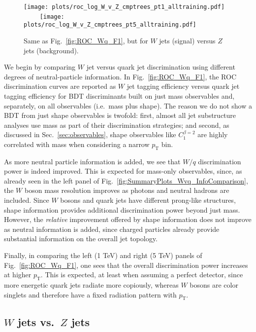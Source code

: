 \documentclass[11pt,letterpaper]{article}
\DeclareRobustCommand{\Sec}[1]{Sec.~\ref{#1}}
\DeclareRobustCommand{\Fig}[1]{Fig.~\ref{#1}}
\newcommand{\pt}{p_{\mathrm{T}}}
\begin{document}
\begin{figure}[p]
\begin{center}
\texttt{[image: plots/roc\_log\_W\_v\_Z\_cmptrees\_pt1\_alltraining.pdf]}
$\qquad$
\texttt{[image: plots/roc\_log\_W\_v\_Z\_cmptrees\_pt5\_alltraining.pdf]}
\end{center}
\caption{Same as \Fig{fig:ROC_Wq_F1}, but for $W$ jets (signal) versus $Z$ jets (background).}
\label{fig:ROC_WZ_F1}
\end{figure}


We begin by comparing $W$ jet versus quark jet discrimination using different degrees of neutral-particle information.
%
In \Fig{fig:ROC_Wq_F1}, the ROC discrimination curves are reported as $W$ jet tagging efficiency versus quark jet tagging efficiency for BDT discriminants built on just mass observables and, separately, on all observables (i.e.~mass plus shape).
%
The reason we do not show a BDT from just shape observables is twofold:  first, almost all jet substructure analyses use mass as part of their discrimination strategies; and second, as discussed in \Sec{sec:observables}, shape observables like $C_1^{\beta = 2}$ are highly correlated with mass when considering a narrow $\pt$ bin.

As more neutral particle information is added, we see that $W/q$ discrimination power is indeed improved.
%
This is expected for mass-only observables, since, as already seen in the left panel of \Fig{fig:SummaryPlots_Wvq_InfoComparison}, the $W$ boson mass resolution improves as photons and neutral hadrons are included.
%
Since $W$ bosons and quark jets have different prong-like structures, shape information provides additional discrimination power beyond just mass.
%
However, the \emph{relative} improvement offered by shape information does not improve as neutral information is added, since charged particles already provide substantial information on the overall jet topology.

Finally, in comparing the left (1 TeV) and right (5 TeV) panels of \Fig{fig:ROC_Wq_F1}, one sees that the overall discrimination power increases at higher $\pt$. 
%
This is expected, at least when assuming a perfect detector, since more energetic quark jets radiate more copiously, whereas $W$ bosons are color singlets and therefore have a fixed radiation pattern with $\pt$.



\subsection{\texorpdfstring{$W$}{W} jets vs.\ \texorpdfstring{$Z$}{Z} jets}
\end{document}
